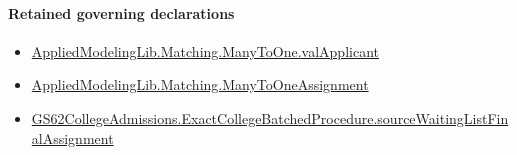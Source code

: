 \documentclass[10pt]{article}
\begin{document}
\paragraph{Retained governing declarations}
\begin{itemize}\raggedright
\item \hyperlink{governing-declaration-8545f3e969a7bb0c}{Applied\allowbreak{}Modeling\allowbreak{}Lib.\allowbreak{}Matching.\allowbreak{}Many\allowbreak{}To\allowbreak{}One.\allowbreak{}val\allowbreak{}Applicant}
\item \hyperlink{governing-declaration-5f205dc5e20311a8}{Applied\allowbreak{}Modeling\allowbreak{}Lib.\allowbreak{}Matching.\allowbreak{}Many\allowbreak{}To\allowbreak{}One\allowbreak{}Assignment}
\item \hyperlink{paper-prerequisite-4b230c4877bf6ef9}{GS62\allowbreak{}College\allowbreak{}Admissions.\allowbreak{}Exact\allowbreak{}College\allowbreak{}Batched\allowbreak{}Procedure.\allowbreak{}source\allowbreak{}Waiting\allowbreak{}List\allowbreak{}Final\allowbreak{}Assignment}
\end{itemize}
\end{document}
